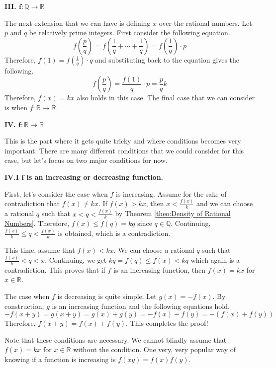 \documentclass[../../../main.tex]{subfiles}
\begin{document}
{\Large\textcolor{BrickRed}
{\textbf{III. $\mathbf{f: \mathbb{Q} \to \mathbb{R}}$}}}

The next extension that we can have is defining $x$ over the
rational numbers. Let $p$ and $q$ be relatively prime integers.
First consider the following equation.
\[
f \left( \frac{p}{q} \right)
= f \left( \frac{1}{q} + \cdots + \frac{1}{q} \right)
= f \left( \frac{1}{q} \right) \cdot p
\]
Therefore, $f(1) = f \left( \frac{1}{q} \right) \cdot q$ and
substituting back to the equation gives the following.
\[
f \left( \frac{p}{q} \right)
= \frac{f(1)}{q} \cdot p
= \frac{p}{q} k
\]
Therefore, $f(x) = kx$ also holds in this case. The final case
that we can consider is when $f: \mathbb{R} \to \mathbb{R}$.

{\Large\textcolor{BrickRed}
{\textbf{IV. $\mathbf{f: \mathbb{R} \to \mathbb{R}}$}}}

This is the part where it gets quite tricky and where conditions
becomes very important. There are many different conditions that
we could consider for this case, but let's focus on two major
conditions for now.

{\large
\textbf{IV.I $\mathbf{f}$ is an increasing or decreasing function.}}

First, let's consider the case when $f$ is increasing. Assume for
the sake of contradiction that $f(x) \neq kx$. If $f(x) > kx$,
then $x < \frac{f(x)}{k}$ and we can choose a rational $q$
such that $x < q < \frac{f(x)}{k}$ by Theorem \ref{theo:Density of
Rational Numbers}. Therefore, $f(x) \leq f(q) = kq$ since
$q \in \mathbb{Q}$. Continuing, $\frac{f(x)}{k} \leq q <
\frac{f(x)}{k}$ is obtained, which is a contradiction.

This time, assume that $f(x) < kx$. We can choose a rational $q$
such that $\frac{f(x)}{k} < q < x$. Continuing, we get
$kq = f(q) \leq f(x) < kq$ which again is a contradiction.
This proves that if $f$ is an increasing function, then $f(x) = kx$
for $x \in \mathbb{R}$.

The case when $f$ is decreasing is quite simple. Let $g(x) = -f(x)$.
By construction, $g$ is an increasing function and the following
equations hold.
\[
-f(x + y)
= g(x + y)
= g(x) + g(y)
= -f(x) - f(y)
= -(f(x) + f(y))
\]
Therefore, $f(x + y) = f(x) + f(y)$. This completes the proof!

Note that these conditions are necessary. We cannot blindly assume
that $f(x) = kx$ for $x \in \mathbb{R}$ without the condition.
One very, very popular way of knowing if a function is increasing
is $f(xy) = f(x) f(y)$.
\end{document}
